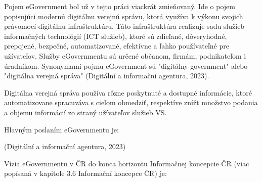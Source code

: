 


Pojem eGovernment bol už v tejto práci viackrát zmieňovaný. Ide o pojem popisujúci modernú digitálnu verejnú správu, ktorá využíva k výkonu svojich právomocí digitálnu infraštruktúru. Táto infraštruktúra realizuje sadu služieb informačných technológií (ICT služieb), ktoré sú zdieľané, dôveryhodné, prepojené, bezpečné, automatizované, efektívne a ľahko používateľné pre užívateľov. Služby eGovernmentu sú určené občanom, firmám, podnikateľom i úradníkom. Synonymami pojmu eGovernment sú "digitálny government" alebo "digitálna verejná správa" \scr(Digitální a informační agentura, 2023).

Digitálna verejná správa používa rôzne poskytnuté a dostupné informácie, ktoré automatizovane spracuváva s cieľom obmedziť, respektíve znížt množstvo podania a objemu informácií zo straný užívateľov služieb VS.

Hlavným poslaním eGovernmentu je: 

 \scr(Digitální a informační agentura, 2023)

Vízia eGovernmentu v ČR do konca horizontu Informačnej koncepcie ČR (viac popísaná v kapitole 3.6 Informační koncepce ČR) je: 

